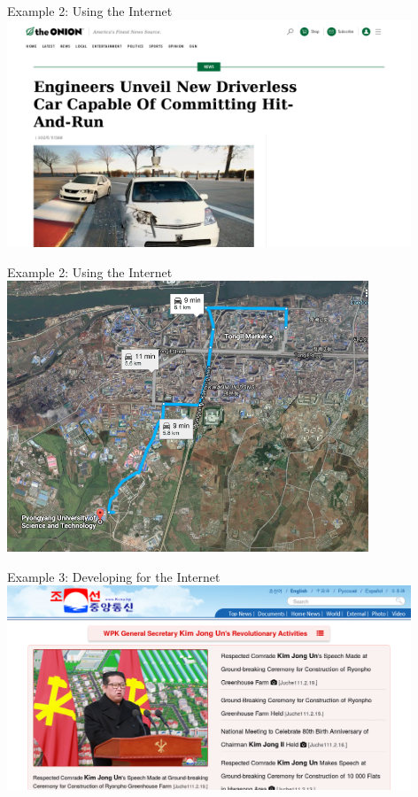 \documentclass{beamer}
\newcommand{\imgslide}[1]{
{
\usebackgroundtemplate{\texttt{[image: \#1]} }
\begin{frame}{}
\end{frame}
}
}
\begin{document}
\begin{frame}{Example 2: Using the Internet}
    \includegraphics[width=4.75in]{img/the-onion}

\end{frame}

\begin{frame}{Example 2: Using the Internet}
    \centering
    \includegraphics[width=4.25in]{img/google-maps}

\end{frame}

\begin{frame}{Example 3: Developing for the Internet}
    \includegraphics[width=4.75in]{img/kcna-2022-02-22}
\end{frame}
\end{document}
